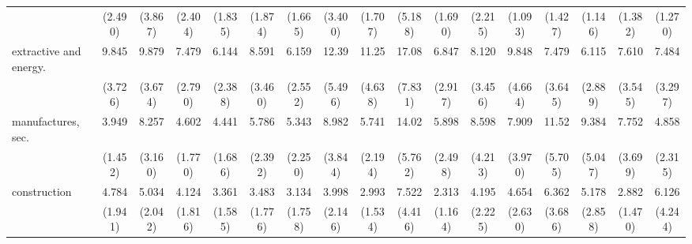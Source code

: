 {\begin{tabular}{l*{16}{c}}
                    &     (2.490)         &     (3.867)         &     (2.404)         &     (1.835)         &     (1.874)         &     (1.665)         &     (3.400)         &     (1.707)         &     (5.188)         &     (1.690)         &     (2.215)         &     (1.093)         &     (1.427)         &     (1.146)         &     (1.382)         &     (1.270)         \\
[1em]
extractive and energy.&       9.845\sym{***}&       9.879\sym{***}&       7.479\sym{***}&       6.144\sym{***}&       8.591\sym{***}&       6.159\sym{***}&       12.39\sym{***}&       11.25\sym{***}&       17.08\sym{***}&       6.847\sym{***}&       8.120\sym{***}&       9.848\sym{***}&       7.479\sym{***}&       6.115\sym{***}&       7.610\sym{***}&       7.484\sym{***}\\
                    &     (3.726)         &     (3.674)         &     (2.790)         &     (2.388)         &     (3.460)         &     (2.552)         &     (5.496)         &     (4.638)         &     (7.831)         &     (2.917)         &     (3.456)         &     (4.664)         &     (3.645)         &     (2.889)         &     (3.545)         &     (3.297)         \\
[1em]
manufactures, sec.  &       3.949\sym{***}&       8.257\sym{***}&       4.602\sym{***}&       4.441\sym{***}&       5.786\sym{***}&       5.343\sym{***}&       8.982\sym{***}&       5.741\sym{***}&       14.02\sym{***}&       5.898\sym{***}&       8.598\sym{***}&       7.909\sym{***}&       11.52\sym{***}&       9.384\sym{***}&       7.752\sym{***}&       4.858\sym{***}\\
                    &     (1.452)         &     (3.160)         &     (1.770)         &     (1.686)         &     (2.392)         &     (2.250)         &     (3.844)         &     (2.194)         &     (5.762)         &     (2.498)         &     (4.213)         &     (3.970)         &     (5.705)         &     (5.047)         &     (3.699)         &     (2.315)         \\
[1em]
construction        &       4.784\sym{***}&       5.034\sym{***}&       4.124\sym{**} &       3.361\sym{*}  &       3.483\sym{*}  &       3.134\sym{*}  &       3.998\sym{**} &       2.993\sym{*}  &       7.522\sym{***}&       2.313         &       4.195\sym{**} &       4.654\sym{**} &       6.362\sym{**} &       5.178\sym{**} &       2.882\sym{*}  &       6.126\sym{**} \\
                    &     (1.941)         &     (2.042)         &     (1.816)         &     (1.585)         &     (1.776)         &     (1.758)         &     (2.146)         &     (1.534)         &     (4.416)         &     (1.164)         &     (2.225)         &     (2.630)         &     (3.686)         &     (2.858)         &     (1.470)         &     (4.244)         \\

\end{tabular}}
